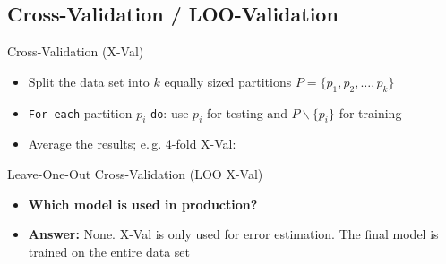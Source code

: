 \subsection{Cross-Validation / LOO-Validation}

\begin{frame}{Cross-Validation (X-Val)}{}\important
	\begin{itemize}
		\item Split the data set into $k$ equally sized partitions $P = \{ p_1, p_2, \dots, p_k \}$
		\item \texttt{For each} partition $p_i$ \texttt{do}: use $p_i$ for testing and $P \backslash \{ p_i \}$ for training
		\item Average the results; e.\,g. 4-fold X-Val:
	\end{itemize}
	
	\vspace*{-3mm}
	
\end{frame}


\begin{frame}{Leave-One-Out Cross-Validation (LOO X-Val)}{}
	\vspace*{2mm}
	
	\vspace*{3mm}
	\begin{boxBlueNoFrame}
		
	\end{boxBlueNoFrame}
	
	\begin{itemize}
		\item \textbf{Which model is used in production?}
		\item \textbf{Answer:} None. X-Val is only used for error estimation. The final model is trained on the entire data set
	\end{itemize}
\end{frame}


